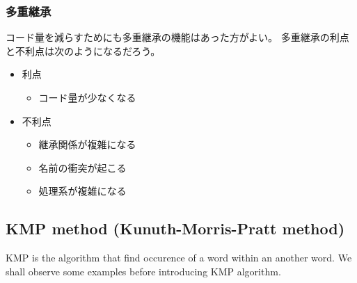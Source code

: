 \subsubsection{多重継承}
コード量を減らすためにも多重継承の機能はあった方がよい。
多重継承の利点と不利点は次のようになるだろう。
\begin{itemize}
\item 利点
	\begin{itemize}
	\item コード量が少なくなる
	\end{itemize}
\item 不利点
	\begin{itemize}
	\item 継承関係が複雑になる
	\item 名前の衝突が起こる
	\item 処理系が複雑になる
	\end{itemize}
\end{itemize}

\subsection{KMP method (Kunuth-Morris-Pratt method)}
KMP is the algorithm that find occurence of a word within an another word.
We shall observe some examples before introducing KMP algorithm.

